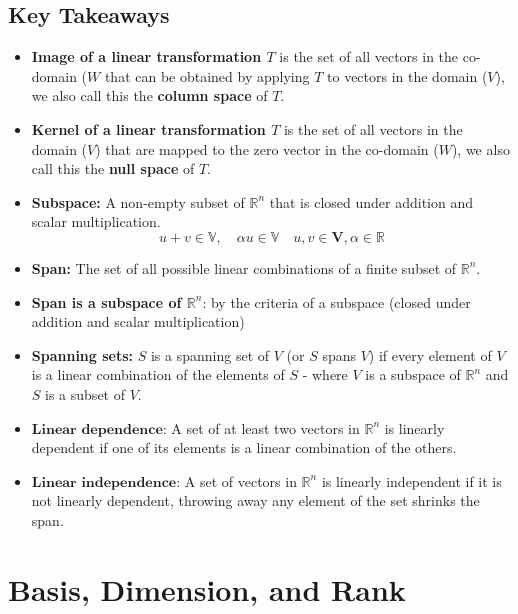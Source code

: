 \documentclass[a4paper, 9pt]{extarticle}
\begin{document}
\subsection{Key Takeaways}
\begin{takeaway-box}{}{}
\begin{itemize}
  \item \textbf{Image of a linear transformation $T$} is the set of all vectors in the co-domain ($W$ that can be obtained by applying $T$ to vectors in the domain ($V$), we also call this the \textbf{column space} of $T$.
  \item \textbf{Kernel of a linear transformation $T$} is the set of all vectors in the domain ($V$) that are mapped to the zero vector in the co-domain ($W$), we also call this the \textbf{null space} of $T$.
  \item \textbf{Subspace:} A non-empty subset of $\mathbb{R}^n$ that is closed under addition and scalar multiplication.
        $$u +v \in \mathbb{V}, \quad \alpha u \in \mathbb{V} \quad u, v \in \textbf{V}, \alpha \in \mathbb{R} $$
  \item \textbf{Span:} The set of all possible linear combinations of a finite subset of $\mathbb{R}^n$.
  \item \textbf{Span is a subspace of $\mathbb{R}^n$}: by the criteria of a subspace (closed under addition and scalar multiplication)
  \item \textbf{Spanning sets:} $S$ is a spanning set of $V$  (or $S$ spans $V$) if every element of $V$ is a linear combination of the elements of $S$ - where $V$ is a subspace of $\mathbb{R}^n$ and $S$ is a subset of $V$.
  \item $\textbf{Linear dependence}$: A set of at least two vectors in $\mathbb{R}^n$ is linearly dependent if one of its elements is a linear combination of the others.
  \item $\textbf{Linear independence}$: A set of vectors in $\mathbb{R}^n$ is linearly independent if it is not linearly dependent, throwing away any element of the set shrinks the span.
\end{itemize}
\end{takeaway-box}
\section{Basis, Dimension, and Rank}
\end{document}
